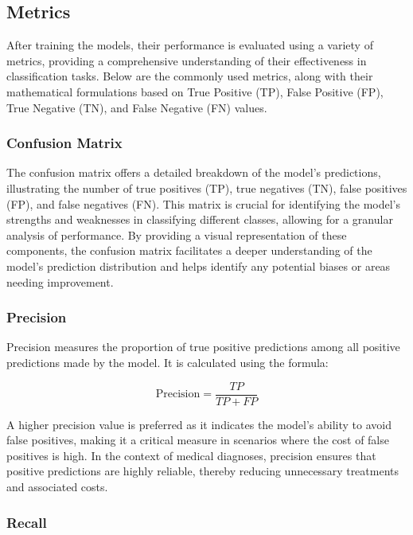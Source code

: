 \subsection{Metrics}\label{metrics}

After training the models, their performance is evaluated using a variety of metrics, providing a comprehensive understanding of their effectiveness in classification tasks. Below are the commonly used metrics, along with their mathematical formulations based on True Positive (TP), False Positive (FP), True Negative (TN), and False Negative (FN) values.

\subsubsection{Confusion Matrix}

The confusion matrix offers a detailed breakdown of the model's predictions, illustrating the number of true positives (TP), true negatives (TN), false positives (FP), and false negatives (FN). This matrix is crucial for identifying the model's strengths and weaknesses in classifying different classes, allowing for a granular analysis of performance. By providing a visual representation of these components, the confusion matrix facilitates a deeper understanding of the model's prediction distribution and helps identify any potential biases or areas needing improvement.

\subsubsection{Precision}

Precision measures the proportion of true positive predictions among all positive predictions made by the model. It is calculated using the formula:

\[
\text{Precision} = \frac{TP}{TP + FP}
\]

A higher precision value is preferred as it indicates the model's ability to avoid false positives, making it a critical measure in scenarios where the cost of false positives is high. In the context of medical diagnoses, precision ensures that positive predictions are highly reliable, thereby reducing unnecessary treatments and associated costs.

\subsubsection{Recall}

